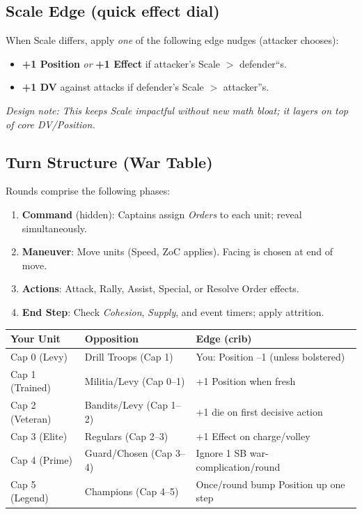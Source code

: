 \documentclass[11pt]{article}
\begin{document}
\subsection{Scale Edge (quick effect dial)}
When Scale differs, apply \emph{one} of the following edge nudges (attacker chooses):
\begin{itemize}[leftmargin=*]
  \item \textbf{+1 Position} \emph{or} \textbf{+1 Effect} if attacker's Scale $>$ defender``s.
  \item \textbf{+1 DV} against attacks if defender's Scale $>$ attacker''s.
\end{itemize}
\textit{Design note: This keeps Scale impactful without new math bloat; it layers on top of core DV/Position.}

\subsection{Turn Structure (War Table)}
Rounds comprise the following phases:
\begin{enumerate}[leftmargin=\textit{,label=\Roman}.]
  \item \textbf{Command} (hidden): Captains assign \emph{Orders} to each unit; reveal simultaneously.
  \item \textbf{Maneuver}: Move units (Speed, ZoC applies). Facing is chosen at end of move.
  \item \textbf{Actions}: Attack, Rally, Assist, Special, or Resolve Order effects.
  \item \textbf{End Step}: Check \emph{Cohesion}, \emph{Supply}, and event timers; apply attrition.
\end{enumerate}

\begin{center}\small
\begin{longtable}{lll}
\toprule
\textbf{Your Unit} & \textbf{Opposition} & \textbf{Edge (crib)} \\
\midrule
Cap 0 (Levy) & Drill Troops (Cap 1) & You: Position --1 (unless bolstered) \\
Cap 1 (Trained) & Militia/Levy (Cap 0--1) & +1 Position when fresh \\
Cap 2 (Veteran) & Bandits/Levy (Cap 1--2) & +1 die on first decisive action \\
Cap 3 (Elite) & Regulars (Cap 2--3) & +1 Effect on charge/volley \\
Cap 4 (Prime) & Guard/Chosen (Cap 3--4) & Ignore 1 SB war-complication/round \\
Cap 5 (Legend) & Champions (Cap 4--5) & Once/round bump Position up one step \\
\bottomrule
\end{longtable}
\end{center}
\end{document}
